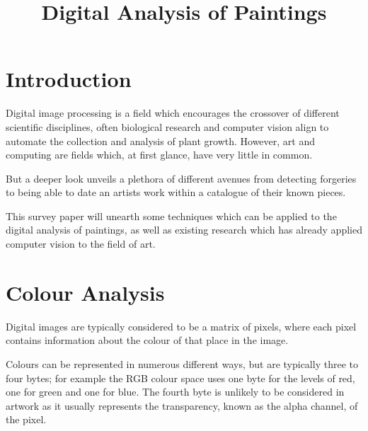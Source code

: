 \documentclass[conference]{IEEEtran}
\begin{document}
\title{Digital Analysis of Paintings}

\author{
}

\maketitle

\begin{abstract}
\end{abstract}


\IEEEpeerreviewmaketitle

\section{Introduction}
Digital image processing is a field which encourages the crossover of different
scientific disciplines, often biological research and computer vision align to
automate the collection and analysis of plant growth. However, art and
computing are fields which, at first glance, have very little in common.

But a deeper look unveils a plethora of different avenues from detecting
forgeries to being able to date an artists work within a catalogue of their
known pieces.

This survey paper will unearth some techniques which can be applied to the
digital analysis of paintings, as well as existing research which has already
applied computer vision to the field of art.

\section{Colour Analysis}
Digital images are typically considered to be a matrix of pixels, where each
pixel contains information about the colour of that place in the image. 

Colours can be represented in numerous different ways, but are typically three
to four bytes; for example the \gls{RGB} colour space uses one byte for the
levels of red, one for green and one for blue. The fourth byte is unlikely to
be considered in artwork as it usually represents the transparency, known as
the alpha channel, of the pixel.
\end{document}
